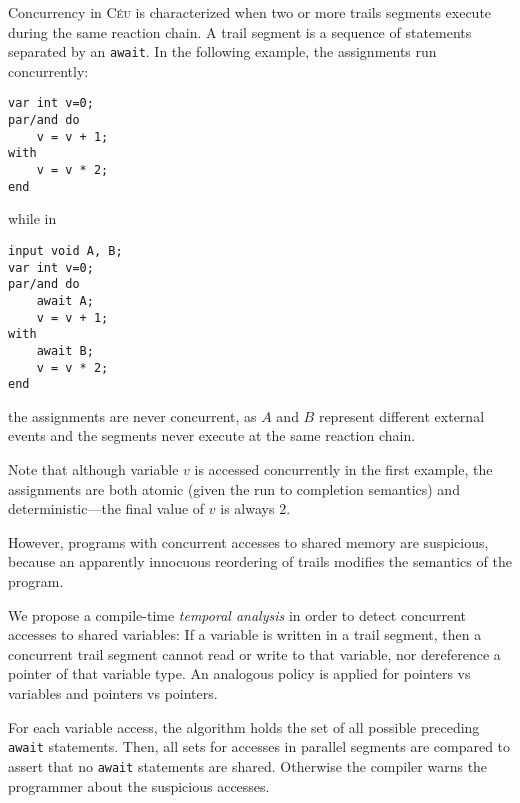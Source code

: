 \documentclass[10pt]{sensys-proc}
\newcommand{\CEU}{\textsc{C\'{e}u}\xspace}
\newcommand{\code}[1] {{\small{\texttt{#1}}}}
\begin{document}
Concurrency in \CEU is characterized when two or more trails segments execute 
during the same reaction chain.
A trail segment is a sequence of statements separated by an \code{await}.
In the following example, the assignments run concurrently:

\begin{minipage}[t]{0.30\linewidth}
{\small
\begin{verbatim}
var int v=0;
par/and do
    v = v + 1;
with
    v = v * 2;
end
\end{verbatim}
}
\end{minipage}
\hspace{0cm}
\begin{minipage}[t]{0.30\linewidth}
while in
\end{minipage}
\hspace{0cm}
\begin{minipage}[t]{0.25\linewidth}
{\small
\begin{verbatim}
input void A, B;
var int v=0;
par/and do
    await A;
    v = v + 1;
with
    await B;
    v = v * 2;
end
\end{verbatim}
}
\end{minipage}

the assignments are never concurrent, as $A$ and $B$ represent different 
external events and the segments never execute at the same reaction chain.

Note that although variable $v$ is accessed concurrently in the first example, 
the assignments are both atomic (given the run to completion semantics) and 
deterministic---the final value of $v$ is always $2$.

However, programs with concurrent accesses to shared memory are suspicious, 
because an apparently innocuous reordering of trails modifies the semantics of 
the program.


We propose a compile-time \emph{temporal analysis} in order to detect 
concurrent accesses to shared variables:
If a variable is written in a trail segment, then a concurrent trail segment 
cannot read or write to that variable, nor dereference a pointer of that 
variable type.
An analogous policy is applied for pointers vs variables and pointers vs 
pointers.

For each variable access, the algorithm holds the set of all possible preceding 
\code{await} statements.
Then, all sets for accesses in parallel segments are compared to assert that no 
\code{await} statements are shared.
Otherwise the compiler warns the programmer about the suspicious accesses.
\end{document}
